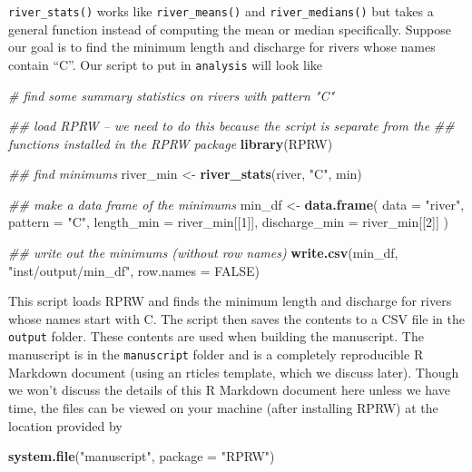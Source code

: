 \documentclass[
]{book}
\newenvironment{Shaded}{\begin{snugshade}}{\end{snugshade}}
\newcommand{\CommentTok}[1]{\textcolor[rgb]{0.56,0.35,0.01}{\textit{#1}}}
\newcommand{\DataTypeTok}[1]{\textcolor[rgb]{0.13,0.29,0.53}{#1}}
\newcommand{\DecValTok}[1]{\textcolor[rgb]{0.00,0.00,0.81}{#1}}
\newcommand{\KeywordTok}[1]{\textcolor[rgb]{0.13,0.29,0.53}{\textbf{#1}}}
\newcommand{\NormalTok}[1]{#1}
\newcommand{\OtherTok}[1]{\textcolor[rgb]{0.56,0.35,0.01}{#1}}
\newcommand{\StringTok}[1]{\textcolor[rgb]{0.31,0.60,0.02}{#1}}
\begin{document}
\texttt{river\_stats()} works like \texttt{river\_means()} and \texttt{river\_medians()} but takes a general function instead of computing the mean or median specifically. Suppose our goal is to find the minimum length and discharge for rivers whose names contain ``C''. Our script to put in \texttt{analysis} will look like

\begin{Shaded}
\begin{Highlighting}[]
\CommentTok{# find some summary statistics on rivers with pattern "C"}

\CommentTok{## load RPRW -- we need to do this because the script is separate from the }
  \CommentTok{## functions installed in the RPRW package}
\KeywordTok{library}\NormalTok{(RPRW) }

\CommentTok{## find minimums}
\NormalTok{river_min <-}\StringTok{ }\KeywordTok{river_stats}\NormalTok{(river, }\StringTok{"C"}\NormalTok{, min)}

\CommentTok{## make a data frame of the minimums}
\NormalTok{min_df <-}\StringTok{ }\KeywordTok{data.frame}\NormalTok{(}
  \DataTypeTok{data =} \StringTok{"river"}\NormalTok{,}
  \DataTypeTok{pattern =} \StringTok{"C"}\NormalTok{,}
  \DataTypeTok{length_min =}\NormalTok{ river_min[[}\DecValTok{1}\NormalTok{]],}
  \DataTypeTok{discharge_min =}\NormalTok{ river_min[[}\DecValTok{2}\NormalTok{]]}
\NormalTok{)}

\CommentTok{## write out the minimums (without row names)}
\KeywordTok{write.csv}\NormalTok{(min_df, }\StringTok{"inst/output/min_df"}\NormalTok{, }\DataTypeTok{row.names =} \OtherTok{FALSE}\NormalTok{)}
\end{Highlighting}
\end{Shaded}

This script loads RPRW and finds the minimum length and discharge for rivers whose names start with C. The script then saves the contents to a CSV file in the \texttt{output} folder. These contents are used when building the manuscript. The manuscript is in the \texttt{manuscript} folder and is a completely reproducible R Markdown document (using an rticles template, which we discuss later). Though we won't discuss the details of this R Markdown document here unless we have time, the files can be viewed on your machine (after installing RPRW) at the location provided by

\begin{Shaded}
\begin{Highlighting}[]
\KeywordTok{system.file}\NormalTok{(}\StringTok{"manuscript"}\NormalTok{, }\DataTypeTok{package =} \StringTok{"RPRW"}\NormalTok{)}
\end{Highlighting}
\end{Shaded}
\end{document}
